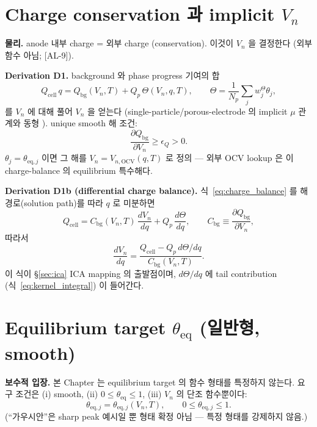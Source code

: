 \documentclass[11pt,a4paper]{article}
\newcommand{\eq}{\mathrm{eq}}
\newcommand{\bg}{\mathrm{bg}}
\newcommand{\cell}{\mathrm{cell}}
\newcommand{\AL}[1]{\textsf{[AL-#1]}}
\begin{document}
\section{Charge conservation 과 implicit $V_n$}\label{sec:charge}
\textbf{물리.} anode 내부 charge = 외부 charge (conservation). 이것이 $V_n$ 을 결정한다
(외부 함수 아님; \AL{9}).

\textbf{Derivation D1.} background 와 phase progress 기여의 합
\begin{equation}
Q_\cell\,q = Q_\bg(V_n,T) + Q_p\,\Theta(V_n,q,T),\qquad \Theta=\frac1{N_p}\sum_j w^\Theta_j\theta_j,
\label{eq:charge_balance}
\end{equation}
를 $V_n$ 에 대해 풀어 $V_n$ 을 얻는다 (single-particle/porous-electrode 의 implicit $\mu$
관계와 동형 \cite{doyle1993,newman}). unique smooth 해 조건:
\begin{equation}
\frac{\partial Q_\bg}{\partial V_n}\ge\epsilon_Q>0.
\label{eq:monotone}
\end{equation}
$\theta_j=\theta_{\eq,j}$ 이면 그 해를 $V_n=V_{n,\mathrm{OCV}}(q,T)$ 로 정의 — 외부 OCV
lookup 은 이 charge-balance 의 equilibrium 특수해다.

\textbf{Derivation D1b (differential charge balance).} 식~\eqref{eq:charge_balance} 를 해
경로(solution path)를 따라 $q$ 로 미분하면
\begin{equation}
Q_\cell=C_\bg(V_n,T)\,\frac{dV_n}{dq}+Q_p\,\frac{d\Theta}{dq},\qquad
C_\bg\equiv\frac{\partial Q_\bg}{\partial V_n},
\label{eq:charge_balance_differential}
\end{equation}
따라서
\begin{equation}
\frac{dV_n}{dq}=\frac{Q_\cell-Q_p\,d\Theta/dq}{C_\bg(V_n,T)}.
\label{eq:dvdq_charge}
\end{equation}
이 식이 \S\ref{sec:ica} ICA mapping 의 출발점이며, $d\Theta/dq$ 에 tail contribution
(식~\eqref{eq:kernel_integral}) 이 들어간다.

\section{Equilibrium target $\theta_\eq$ (일반형, smooth)}\label{sec:equilibrium}
\textbf{보수적 입장.} 본 Chapter 는 equilibrium target 의 함수 형태를 특정하지 않는다.
요구 조건은 (i) smooth, (ii) $0\le\theta_\eq\le1$, (iii) $V_n$ 의 단조 함수뿐이다:
\begin{equation}
\theta_{\eq,j}=\theta_{\eq,j}(V_n,T),\qquad 0\le\theta_{\eq,j}\le1.
\label{eq:thetae}
\end{equation}
(``가우시안''은 sharp peak 예시일 뿐 형태 확정 아님 — 특정 형태를 강제하지 않음.)
\end{document}
